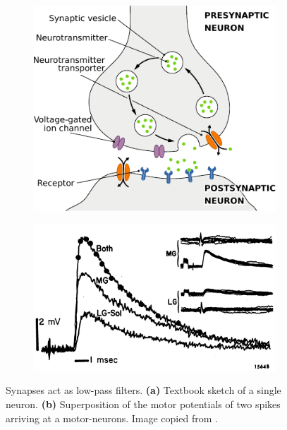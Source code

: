 \documentclass[10pt,letterpaper,oneside]{article}
\begin{document}
\begin{figure}
	\centering
	\begin{subfigure}{0.375\textwidth}%
		\centering%
		\includegraphics[width=\textwidth]{media/synapse_schematic.pdf}%
		\label{fig:synapse_schematic}
	\end{subfigure}%
	\begin{subfigure}{0.55\textwidth}%
		\centering%
		\includegraphics[width=\textwidth]{media/burke_1967_epsp.png}%
		\label{fig:burke_1967_epsp}
	\end{subfigure}%
	\caption{Synapses act as low-pass filters. \textbf{(a)} Textbook sketch of a single neuron. \textbf{(b)} Superposition of the motor potentials of two spikes arriving at a motor-neurons. Image copied from \cite{burke1967composite}.}
\end{figure}
\end{document}
